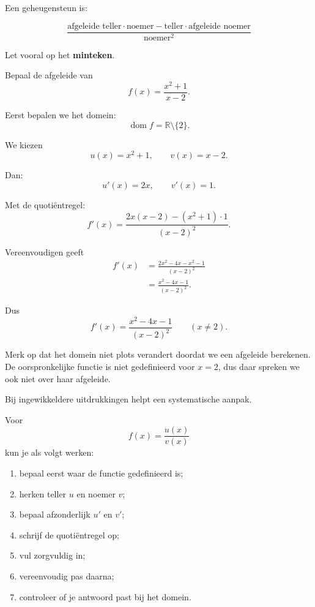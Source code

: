 \documentclass{ximera}
\begin{document}
Een geheugensteun is:

\[
\boxed{
\frac{
\text{afgeleide teller}\cdot\text{noemer}
-
\text{teller}\cdot\text{afgeleide noemer}
}{
\text{noemer}^2
}
}
\]

Let vooral op het \textbf{minteken}.




\begin{voorbeeld}
Bepaal de afgeleide van
\[
f(x)=\frac{x^2+1}{x-2}.
\]

Eerst bepalen we het domein:
\[
\operatorname{dom}f=\mathbb{R}\setminus\{2\}.
\]

We kiezen
\[
u(x)=x^2+1,
\qquad
v(x)=x-2.
\]

Dan:
\[
u'(x)=2x,
\qquad
v'(x)=1.
\]

Met de quotiëntregel:
\[
f'(x)
=
\frac{2x(x-2)-(x^2+1)\cdot1}{(x-2)^2}.
\]

Vereenvoudigen geeft
\[
\begin{aligned}
f'(x)
&=
\frac{2x^2-4x-x^2-1}{(x-2)^2}\\
&=
\frac{x^2-4x-1}{(x-2)^2}.
\end{aligned}
\]

Dus
\[
\boxed{
f'(x)=\frac{x^2-4x-1}{(x-2)^2}
}
\qquad (x\neq2).
\]
\end{voorbeeld}

Merk op dat het domein niet plots verandert doordat we een afgeleide
berekenen. De oorspronkelijke functie is niet gedefinieerd voor $x=2$,
dus daar spreken we ook niet over haar afgeleide.




Bij ingewikkeldere uitdrukkingen helpt een systematische aanpak.


Voor
\[
f(x)=\frac{u(x)}{v(x)}
\]
kun je als volgt werken:

\begin{enumerate}
  \item bepaal eerst waar de functie gedefinieerd is;
  \item herken teller $u$ en noemer $v$;
  \item bepaal afzonderlijk $u'$ en $v'$;
  \item schrijf de quotiëntregel op;
  \item vul zorgvuldig in;
  \item vereenvoudig pas daarna;
  \item controleer of je antwoord past bij het domein.
\end{enumerate}
\end{document}
